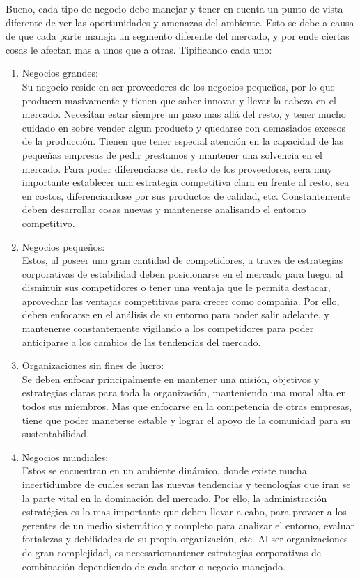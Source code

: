 \begin{itemize}
\begin{enumerate}
		Bueno, cada tipo de negocio debe manejar y tener en cuenta un punto de vista diferente de ver las oportunidades y amenazas del ambiente. Esto se debe a causa de que cada parte maneja un segmento diferente del mercado, y por ende ciertas cosas le afectan mas a unos que a otras. Tipificando cada uno:\\
	\begin{enumerate}
		\item Negocios grandes:\\
			Su negocio reside en ser proveedores de los negocios peque\~nos, por lo que producen masivamente y tienen que saber innovar y llevar la cabeza en el mercado. Necesitan estar siempre un paso mas all\'a del resto, y tener mucho cuidado en sobre vender algun producto y quedarse con demasiados excesos de la producci\'on. Tienen que tener especial atenci\'on en la capacidad de las peque\~nas empresas de pedir prestamos y mantener una solvencia en el mercado. Para poder diferenciarse del resto de los proveedores, sera muy importante establecer una estrategia competitiva clara en frente al resto, sea en costos, diferenciandose por sus productos de calidad, etc. Constantemente deben desarrollar cosas nuevas y mantenerse analisando el entorno competitivo.
		\item Negocios peque\~nos:\\
			Estos, al poseer una gran cantidad de competidores, a traves de estrategias corporativas de estabilidad deben posicionarse en el mercado para luego, al disminuir sus competidores o tener una ventaja que le permita destacar, aprovechar las ventajas competitivas para crecer como compa\~nia. Por ello, deben enfocarse en el an\'alisis de su entorno para poder salir adelante, y mantenerse constantemente vigilando a los competidores para poder anticiparse a los cambios de las tendencias del mercado.
 
		\item Organizaciones sin fines de lucro:\\ Se deben enfocar principalmente en mantener una misi\'on, objetivos y estrategias claras para toda la organizaci\'on, manteniendo una moral alta en todos sus miembros. Mas que enfocarse en la competencia de otras empresas, tiene que poder maneterse estable y lograr el apoyo de la comunidad para su sustentabilidad.
		\item Negocios mundiales:\\ Estos se encuentran en un ambiente din\'amico, donde existe mucha incertidumbre de cuales seran las nuevas tendencias y tecnolog\'ias que iran se la parte vital en la dominaci\'on del mercado. Por ello, la administraci\'on estrat\'egica es lo mas importante que deben llevar a cabo, para proveer a los gerentes de un medio sistem\'atico y completo para analizar el entorno, evaluar fortalezas y debilidades de su propia organizaci\'on, etc. Al ser organizaciones de gran complejidad, es necesariomantener estrategias corporativas de combinaci\'on dependiendo de cada sector o negocio manejado. 
	\end{enumerate}


\end{enumerate}
\end{itemize}

